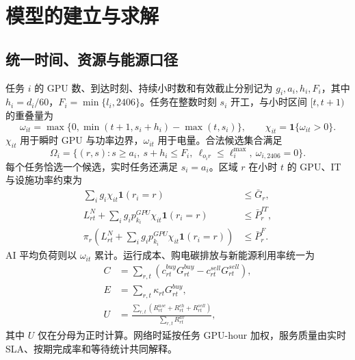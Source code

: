 \section{模型的建立与求解}

\subsection{统一时间、资源与能源口径}
任务 $i$ 的 GPU 数、到达时刻、持续小时数和有效截止分别记为 $g_i,a_i,h_i,F_i$，其中 $h_i=d_i/60$，$F_i=\min\{l_i,2406\}$。任务在整数时刻 $s_i$ 开工，与小时区间 $[t,t+1)$ 的重叠量为
\begin{equation}
\omega_{it}=\max\{0,\min(t+1,s_i+h_i)-\max(t,s_i)\},\qquad
\chi_{it}=\mathbf 1\{\omega_{it}>0\}.
\end{equation}
$\chi_{it}$ 用于瞬时 GPU 与功率边界，$\omega_{it}$ 用于电量。合法候选集合满足
\begin{equation}
\Omega_i=\{(r,s):s\ge a_i,\ s+h_i\le F_i,\ \ell_{o_i r}\le \ell_i^{\max},\ \omega_{i,2406}=0\}.
\end{equation}
每个任务恰选一个候选，实时任务还满足 $s_i=a_i$。区域 $r$ 在小时 $t$ 的 GPU、IT 与设施功率约束为
\begin{align}
\sum_i g_i\chi_{it}\mathbf 1(r_i=r)&\le \bar G_r,\\
L_{rt}^{N}+\sum_i g_i p_{k_i}^{GPU}\chi_{it}\mathbf 1(r_i=r)&\le \bar P_r^{IT},\\
\pi_r\!\left(L_{rt}^{N}+\sum_i g_i p_{k_i}^{GPU}\chi_{it}\mathbf 1(r_i=r)\right)&\le \bar P_r^{F}.
\end{align}
AI 平均负荷则以 $\omega_{it}$ 累计。运行成本、购电碳排放与新能源利用率统一为
\begin{align}
C&=\sum_{r,t}(c^{buy}_{rt}G^{buy}_{rt}-c^{sell}_{rt}G^{sell}_{rt}),\\
E&=\sum_{r,t}\kappa_{rt}G^{buy}_{rt},\\
U&=\frac{\sum_{r,t}(R^{use}_{rt}+R^{ch}_{rt}+R^{sell}_{rt})}{\sum_{r,t}R^{av}_{rt}},
\end{align}
其中 $U$ 仅在分母为正时计算。网络时延按任务 GPU-hour 加权，服务质量由实时 SLA、按期完成率和等待统计共同解释。

